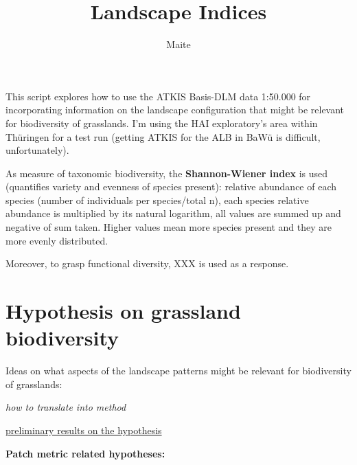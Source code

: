 \documentclass[
  letterpaper,
  DIV=11,
  numbers=noendperiod]{scrartcl}
\title{Landscape Indices}
\author{Maite}
\date{}
\begin{document}
\maketitle
\ifdefined\Shaded\renewenvironment{Shaded}{\begin{tcolorbox}[interior hidden, borderline west={3pt}{0pt}{shadecolor}, boxrule=0pt, frame hidden, sharp corners, enhanced, breakable]}{\end{tcolorbox}}\fi

This script explores how to use the ATKIS Basis-DLM data 1:50.000 for
incorporating information on the landscape configuration that might be
relevant for biodiversity of grasslands. I'm using the HAI exploratory's
area within Thüringen for a test run (getting ATKIS for the ALB in BaWü
is difficult, unfortunately).

As measure of taxonomic biodiversity, the \textbf{Shannon-Wiener index}
is used (quantifies variety and evenness of species present): relative
abundance of each species (number of individuals per species/total n),
each species relative abundance is multiplied by its natural logarithm,
all values are summed up and negative of sum taken. Higher values mean
more species present and they are more evenly distributed.

Moreover, to grasp functional diversity, XXX is used as a response.

\hypertarget{hypothesis-on-grassland-biodiversity}{%
\section{Hypothesis on grassland
biodiversity}\label{hypothesis-on-grassland-biodiversity}}

Ideas on what aspects of the landscape patterns might be relevant for
biodiversity of grasslands:

\emph{how to translate into method}

\uline{preliminary results on the hypothesis}

\textbf{Patch metric related hypotheses:}
\end{document}
